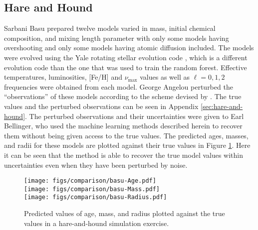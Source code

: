 \documentclass[manuscript]{aastex}
\begin{document}
\subsection{Hare and Hound} 
Sarbani Basu prepared twelve models varied in mass, initial chemical composition, and mixing length parameter with only some models having overshooting and only some models having atomic diffusion included. The models were evolved using the Yale rotating stellar evolution code \citep[YREC,][]{2008Ap&SS.316...31D}, which is a different evolution code than the one that was used to train the random forest. Effective temperatures, luminosities, [Fe/H] and $\nu_{\max}$ values as well as $\ell=0,1,2$ frequencies were obtained from each model. George Angelou perturbed the ``observations'' of these models according to the scheme devised by \citet{spaceinn}. The true values and the perturbed observations can be seen in Appendix \ref{sec:hare-and-hound}. The perturbed observations and their uncertainties were given to Earl Bellinger, who used the machine learning methods described herein to recover them without being given access to the true values. The predicted ages, masses, and radii for these models are plotted against their true values in Figure \ref{fig:hare-comparison}. Here it can be seen that the method is able to recover the true model values within uncertainties even when they have been perturbed by noise. 

\begin{figure}
    \centering
    \texttt{[image: figs/comparison/basu-Age.pdf]}\\
    \texttt{[image: figs/comparison/basu-Mass.pdf]}\\
    \texttt{[image: figs/comparison/basu-Radius.pdf]}
    \caption{Predicted values of age, mass, and radius plotted against the true values in a hare-and-hound simulation exercise.  \label{fig:hare-comparison}}
\end{figure}


\end{document}
